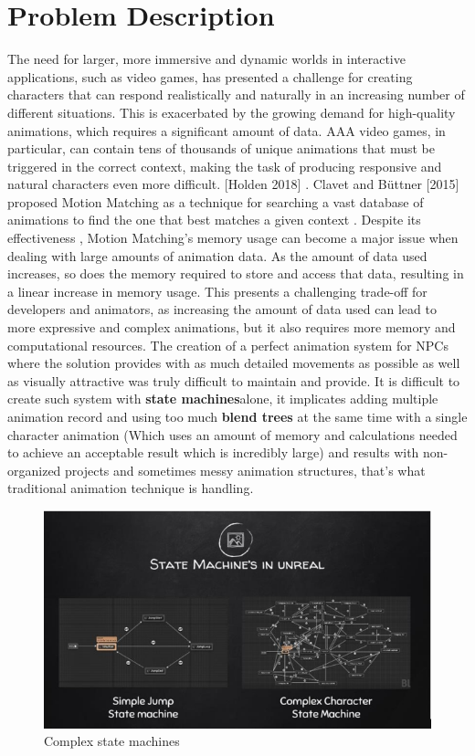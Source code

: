 \documentclass[12pt]{book}
\begin{document}
\section{Problem Description}
The need for larger, more immersive and dynamic worlds in interactive applications, such as
video games, has presented a challenge for creating characters that can respond realistically and
naturally in an increasing number of different situations. This is exacerbated by the growing
demand for high-quality animations, which requires a significant amount of data. AAA video
games, in particular, can contain tens of thousands of unique animations that must be triggered
in the correct context, making the task of producing responsive and natural characters even
more difficult. [Holden 2018] \cite{url-2}.
Clavet and Büttner [2015] proposed Motion Matching as a technique for searching a vast
database of animations to find the one that best matches a given context \cite{url-3}.
Despite its effectiveness , Motion Matching’s memory usage can become a major issue when
dealing with large amounts of animation data. As the amount of data used increases, so does
the memory required to store and access that data, resulting in a linear increase in memory
usage. This presents a challenging trade-off for developers and animators, as increasing the
amount of data used can lead to more expressive and complex animations, but it also requires
more memory and computational resources.
The creation of a perfect animation system for NPCs where the solution provides with as
much detailed movements as possible as well as visually attractive was truly difficult to
maintain and provide. It is difficult to create such system with \textbf{state machines}alone, it implicates adding multiple animation record and using too much \textbf{blend trees} at the same time with a single character animation (Which uses an amount of memory and calculations needed to achieve an acceptable result which is incredibly large) and results with non-organized projects and sometimes messy animation structures, that’s what traditional animation technique is handling.
\begin{figure}[!h]
    \centering
    \includegraphics[scale=0.8]{./Figures/Images/complexeStateMachines.png}
    \caption{Complex state machines}
    \label{Complex state machines}
\end{figure}
\end{document}
